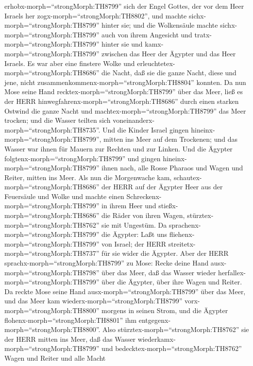 erhobx-morph=``strongMorph:TH8799'' sich der Engel Gottes, der vor dem
Heer Israels her zogx-morph=``strongMorph:TH8802'', und machte
sichx-morph=``strongMorph:TH8799'' hinter sie; und die Wolkensäule
machte sichx-morph=``strongMorph:TH8799'' auch von ihrem Angesicht und
tratx-morph=``strongMorph:TH8799'' hinter sie  und
kamx-morph=``strongMorph:TH8799'' zwischen das Heer der Ägypter und das
Heer Israels. Es war aber eine finstere Wolke und
erleuchtetex-morph=``strongMorph:TH8686'' die Nacht, daß sie die ganze
Nacht, diese und jene, nicht
zusammenkommenx-morph=``strongMorph:TH8804'' konnten.  Da
nun Mose seine Hand recktex-morph=``strongMorph:TH8799'' über das Meer,
ließ es der HERR hinwegfahrenx-morph=``strongMorph:TH8686'' durch einen
starken Ostwind die ganze Nacht und machtex-morph=``strongMorph:TH8799''
das Meer trocken; und die Wasser teilten sich
voneinanderx-morph=``strongMorph:TH8735''.  Und die Kinder
Israel gingen hineinx-morph=``strongMorph:TH8799'', mitten ins Meer auf
dem Trockenen; und das Wasser war ihnen für Mauern zur Rechten und zur
Linken.  Und die Ägypter
folgtenx-morph=``strongMorph:TH8799'' und gingen
hineinx-morph=``strongMorph:TH8799'' ihnen nach, alle Rosse Pharaos und
Wagen und Reiter, mitten ins Meer.  Als nun die Morgenwache
kam, schautex-morph=``strongMorph:TH8686'' der HERR auf der Ägypter Heer
aus der Feuersäule und Wolke und machte einen
Schreckenx-morph=``strongMorph:TH8799'' in ihrem Heer  und
stießx-morph=``strongMorph:TH8686'' die Räder von ihren Wagen,
stürztex-morph=``strongMorph:TH8762'' sie mit Ungestüm. Da
sprachenx-morph=``strongMorph:TH8799'' die Ägypter: Laßt uns
fliehenx-morph=``strongMorph:TH8799'' von Israel; der HERR
streitetx-morph=``strongMorph:TH8737'' für sie wider die Ägypter.
 Aber der HERR sprachx-morph=``strongMorph:TH8799'' zu
Mose: Recke deine Hand ausx-morph=``strongMorph:TH8798'' über das Meer,
daß das Wasser wieder herfallex-morph=``strongMorph:TH8799'' über die
Ägypter, über ihre Wagen und Reiter.  Da reckte Mose seine
Hand ausx-morph=``strongMorph:TH8799'' über das Meer, und das Meer kam
wiederx-morph=``strongMorph:TH8799'' vorx-morph=``strongMorph:TH8800''
morgens in seinen Strom, und die Ägypter
flohenx-morph=``strongMorph:TH8801'' ihm
entgegenx-morph=``strongMorph:TH8800''. Also
stürztex-morph=``strongMorph:TH8762'' sie der HERR mitten ins Meer,
 daß das Wasser wiederkamx-morph=``strongMorph:TH8799'' und
bedecktex-morph=``strongMorph:TH8762'' Wagen und Reiter und alle Macht
